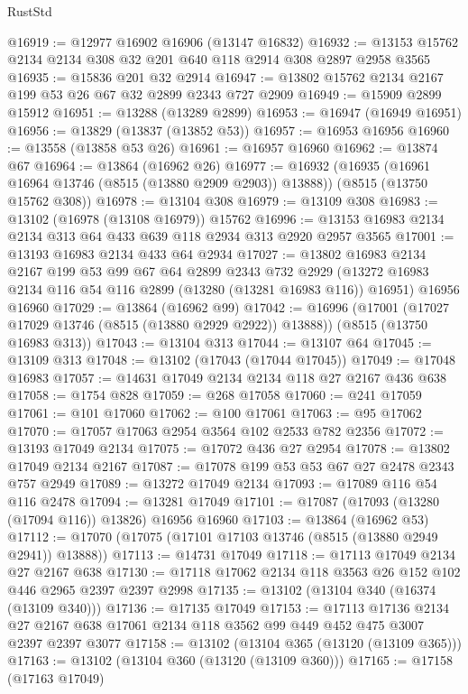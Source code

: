 \begin{lexlean}{RustStd}
\begin{coremodule}
@16919 := @12977 @16902 @16906 (@13147 @16832)
@16932 := @13153 @15762 @2134 @2134 @308 @32 @201 @640 @118 @2914 @308 @2897 @2958 @3565
@16935 := @15836 @201 @32 @2914
@16947 := @13802 @15762 @2134 @2167 @199 @53 @26 @67 @32 @2899 @2343 @727 @2909
@16949 := @15909 @2899 @15912
@16951 := @13288 (@13289 @2899)
@16953 := @16947 (@16949 @16951)
@16956 := @13829 (@13837 (@13852 @53))
@16957 := @16953 @16956
@16960 := @13558 (@13858 @53 @26)
@16961 := @16957 @16960
@16962 := @13874 @67
@16964 := @13864 (@16962 @26)
@16977 := @16932
    (@16935 (@16961 @16964 @13746 (@8515 (@13880 @2909 @2903)) @13888))
    (@8515 (@13750 @15762 @308))
@16978 := @13104 @308
@16979 := @13109 @308
@16983 := @13102 (@16978 (@13108 @16979)) @15762
@16996 := @13153 @16983 @2134 @2134 @313 @64 @433 @639 @118 @2934 @313 @2920 @2957 @3565
@17001 := @13193 @16983 @2134 @433 @64 @2934
@17027 := @13802
    @16983
    @2134
    @2167
    @199
    @53
    @99
    @67
    @64
    @2899
    @2343
    @732
    @2929
    (@13272 @16983 @2134 @116 @54 @116 @2899 (@13280 (@13281 @16983 @116)) @16951)
    @16956
    @16960
@17029 := @13864 (@16962 @99)
@17042 := @16996
    (@17001 (@17027 @17029 @13746 (@8515 (@13880 @2929 @2922)) @13888))
    (@8515 (@13750 @16983 @313))
@17043 := @13104 @313
@17044 := @13107 @64
@17045 := @13109 @313
@17048 := @13102 (@17043 (@17044 @17045))
@17049 := @17048 @16983
@17057 := @14631 @17049 @2134 @2134 @118 @27 @2167 @436 @638
@17058 := @1754 @828
@17059 := @268 @17058
@17060 := @241 @17059
@17061 := @101 @17060
@17062 := @100 @17061
@17063 := @95 @17062
@17070 := @17057 @17063 @2954 @3564 @102 @2533 @782 @2356
@17072 := @13193 @17049 @2134
@17075 := @17072 @436 @27 @2954
@17078 := @13802 @17049 @2134 @2167
@17087 := @17078 @199 @53 @53 @67 @27 @2478 @2343 @757 @2949
@17089 := @13272 @17049 @2134
@17093 := @17089 @116 @54 @116 @2478
@17094 := @13281 @17049
@17101 := @17087 (@17093 (@13280 (@17094 @116)) @13826) @16956 @16960
@17103 := @13864 (@16962 @53)
@17112 := @17070 (@17075 (@17101 @17103 @13746 (@8515 (@13880 @2949 @2941)) @13888))
@17113 := @14731 @17049
@17118 := @17113 @17049 @2134 @27 @2167 @638
@17130 := @17118 @17062 @2134 @118 @3563 @26 @152 @102 @446 @2965 @2397 @2397 @2998
@17135 := @13102 (@13104 @340 (@16374 (@13109 @340)))
@17136 := @17135 @17049
@17153 := @17113
    @17136
    @2134
    @27
    @2167
    @638
    @17061
    @2134
    @118
    @3562
    @99
    @449
    @452
    @475
    @3007
    @2397
    @2397
    @3077
@17158 := @13102 (@13104 @365 (@13120 (@13109 @365)))
@17163 := @13102 (@13104 @360 (@13120 (@13109 @360)))
@17165 := @17158 (@17163 @17049)

\end{coremodule}
\end{lexlean}
